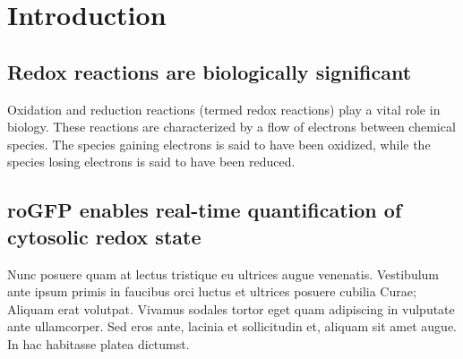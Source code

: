 
\chapter{Introduction} %

\label{Chapter1} %


\section{Redox reactions are biologically significant}
Oxidation and reduction reactions (termed redox reactions) play a vital role in biology. These reactions are characterized by a flow of electrons between chemical species. The species gaining electrons is said to have been oxidized, while the species losing electrons is said to have been reduced. 


\section{roGFP enables real-time quantification of cytosolic redox state}

Nunc posuere quam at lectus tristique eu ultrices augue venenatis. Vestibulum ante ipsum primis in faucibus orci luctus et ultrices posuere cubilia Curae; Aliquam erat volutpat. Vivamus sodales tortor eget quam adipiscing in vulputate ante ullamcorper. Sed eros ante, lacinia et sollicitudin et, aliquam sit amet augue. In hac habitasse platea dictumst.
